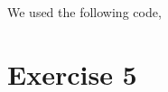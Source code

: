 \documentclass[12pt]{article}
\newcommand{\desc}[1]{\textit{#1} \vspace{1em}}
\begin{document}
We used the following code,






\clearpage

\section*{Exercise 5}
\desc{}


\clearpage
\end{document}

